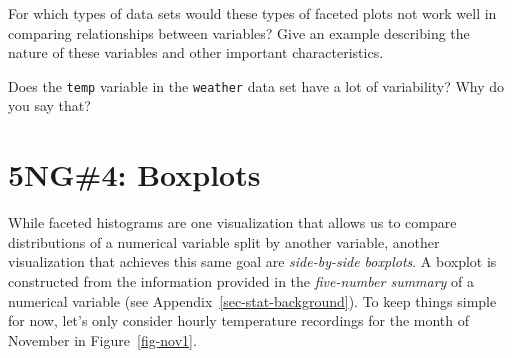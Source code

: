 \documentclass[
  letterpaper,
  DIV=11,
  numbers=noendperiod]{scrreprt}
\theoremstyle{definition}
\theoremstyle{remark}
\begin{document}
\begin{tcolorbox}[enhanced jigsaw, coltitle=black, toprule=.15mm, bottomtitle=1mm, breakable, leftrule=.75mm, title={{🎯} Learning Check 2.20}, opacitybacktitle=0.6, colback=white, rightrule=.15mm, opacityback=0, toptitle=1mm, colbacktitle=quarto-callout-tip-color!10!white, colframe=quarto-callout-tip-color-frame, titlerule=0mm, arc=.35mm, bottomrule=.15mm, left=2mm]
For which types of data sets would these types of faceted plots not work
well in comparing relationships between variables? Give an example
describing the nature of these variables and other important
characteristics.
\end{tcolorbox}

\begin{tcolorbox}[enhanced jigsaw, coltitle=black, toprule=.15mm, bottomtitle=1mm, breakable, leftrule=.75mm, title={{🎯} Learning Check 2.21}, opacitybacktitle=0.6, colback=white, rightrule=.15mm, opacityback=0, toptitle=1mm, colbacktitle=quarto-callout-tip-color!10!white, colframe=quarto-callout-tip-color-frame, titlerule=0mm, arc=.35mm, bottomrule=.15mm, left=2mm]
Does the \texttt{temp} variable in the \texttt{weather} data set have a
lot of variability? Why do you say that?
\end{tcolorbox}

\hypertarget{sec-boxplots}{%
\section{5NG\#4: Boxplots}\label{sec-boxplots}}

While faceted histograms are one visualization that allows us to compare
distributions of a numerical variable split by another variable, another
visualization that achieves this same goal are \emph{side-by-side
boxplots}. A boxplot is constructed from the information provided in the
\emph{five-number summary} of a numerical variable (see
Appendix~\ref{sec-stat-background}). To keep things simple for now,
let's only consider hourly temperature recordings for the month of
November in Figure~\ref{fig-nov1}.
\end{document}
